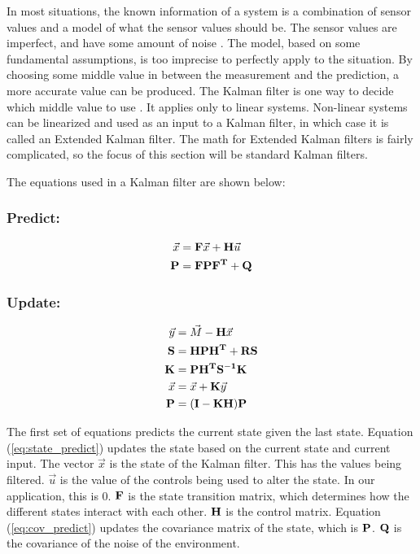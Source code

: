 In most situations, the known information of a system is a combination of sensor values and a model of what the sensor values should be. The sensor values are imperfect, and have some amount of noise \cite{kf_pictures}. The model, based on some fundamental assumptions, is too imprecise to perfectly apply to the situation. By choosing some middle value in between the measurement and the prediction, a more accurate value can be produced. The Kalman filter is one way to decide which middle value to use \cite{kf_robots}. It applies only to linear systems. Non-linear systems can be linearized and used as an input to a Kalman filter, in which case it is called an Extended Kalman filter. The math for Extended Kalman filters is fairly complicated, so the focus of this section will be standard Kalman filters.\par
The equations used in a Kalman filter are shown below:
\subsubsection*{Predict:}
\begin{align}
    \vec{x} &= \mathbf{F}\vec{x} + \mathbf{H}\vec{u}\label{eq:state_predict} \\ 
    \mathbf{P} &= \mathbf{F}\mathbf{P}\mathbf{F^T} + \mathbf{Q} \label{eq:cov_predict}
\end{align}
\subsubsection*{Update:}
\begin{align}
    \vec{y} &= \vec{M} - \mathbf{H}\vec{x} \\
    \mathbf{S}&= \mathbf{HPH^T+RS} \\
    \mathbf{K} &= \mathbf{PH^TS^{-1}K} \\
    \vec{x} &= \vec{x} + \mathbf{K}\vec{y} \\
    \mathbf{P} &= \mathbf{(I-KH)P}
\end{align} \par

The first set of equations predicts the current state given the last state. Equation (\ref{eq:state_predict}) updates the state based on the current state and current input. The vector $\vec{x}$ is the state of the Kalman filter. This has the values being filtered. $\vec{u}$ is the value of the controls being used to alter the state. In our application, this is 0. $\mathbf{F}$ is the state transition matrix, which determines how the different states interact with each other.  $\mathbf{H}$ is the control matrix. Equation (\ref{eq:cov_predict}) updates the covariance matrix of the state, which is $\mathbf{P}$. $\mathbf{Q}$ is the covariance of the noise of the environment. \par

